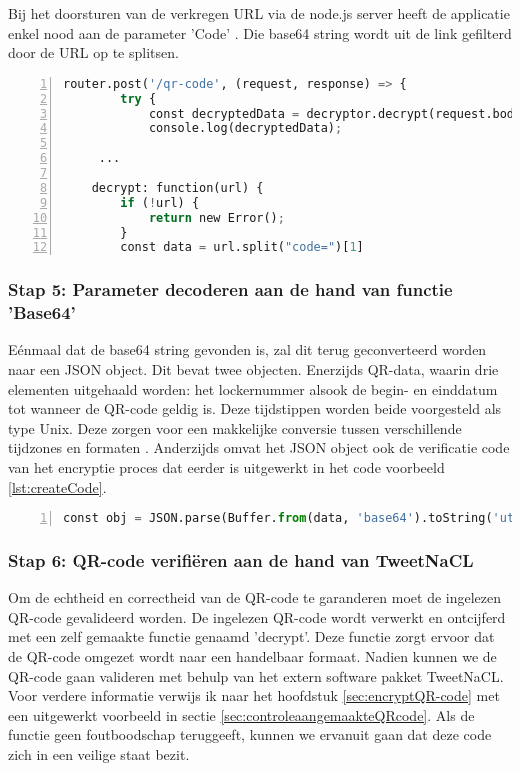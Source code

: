 Bij het doorsturen van de verkregen URL via de node.js server heeft de applicatie enkel nood aan de parameter 'Code' \autocite{Weir2012}.  Die base64 string wordt uit de link gefilterd door de URL op te splitsen. 

\begin{lstlisting}[language=Python, caption={Python script om parameter code uit de link te halen.}, label={lst:pythonLinkSplitting}, numbers=left]
    router.post('/qr-code', (request, response) => {
        try {
            const decryptedData = decryptor.decrypt(request.body.tag);
            console.log(decryptedData);
            
     ...
    
    decrypt: function(url) {
        if (!url) {
            return new Error();
        }
        const data = url.split("code=")[1]
\end{lstlisting}

\subsubsection{Stap 5: Parameter decoderen aan de hand van functie 'Base64'}
Eénmaal dat de base64 string gevonden is, zal dit terug geconverteerd worden naar een \ac{JSON} object. Dit bevat twee objecten. Enerzijds QR-data, waarin drie elementen uitgehaald worden: het lockernummer alsook de begin- en einddatum tot wanneer de QR-code geldig is. Deze tijdstippen worden beide voorgesteld als type Unix. Deze zorgen voor een makkelijke conversie tussen verschillende tijdzones en formaten \autocite{Ritchie1978}. Anderzijds omvat het \ac{JSON} object ook de verificatie code van het encryptie proces dat eerder is uitgewerkt in het code voorbeeld \ref{lst:createCode}. 

\begin{lstlisting}[language=Python, caption={Python code om parameter code te decoderen en informatie op te halen uit het object.}, label={lst:pythonLinkSplitting}, numbers=left]
    const obj = JSON.parse(Buffer.from(data, 'base64').toString('utf8')); 
\end{lstlisting}

\subsubsection{Stap 6: QR-code verifiëren aan de hand van TweetNaCL}

Om de echtheid en correctheid van de QR-code te garanderen moet de ingelezen QR-code gevalideerd worden. De ingelezen QR-code wordt verwerkt en ontcijferd met een zelf gemaakte functie genaamd 'decrypt'. Deze functie zorgt ervoor dat de QR-code omgezet wordt naar een handelbaar formaat. Nadien kunnen we de QR-code gaan valideren met behulp van het extern software pakket TweetNaCL. Voor verdere informatie verwijs ik naar het hoofdstuk \ref{sec:encryptQR-code} met een uitgewerkt voorbeeld in sectie \ref{sec:controleaangemaakteQRcode}. Als de functie geen foutboodschap teruggeeft, kunnen we ervanuit gaan dat deze code zich in een veilige staat bezit.

